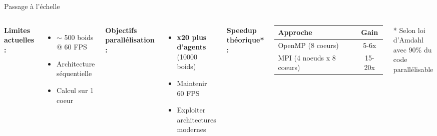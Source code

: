 \documentclass[aspectratio=169]{beamer}
\begin{document}
\begin{frame}{Passage à l'échelle}
\begin{columns}
    \textbf{Limites actuelles :}
    \begin{itemize}
        \item $\sim$ 500 boids @ 60 FPS 
        \item Architecture séquentielle
        \item Calcul sur 1 coeur
    \end{itemize}

    \vspace{0.5cm}

    \textbf{Objectifs parallélisation :}
    \begin{itemize}
        \item \textbf{x20 plus d'agents} (10000 boids)
        \item Maintenir 60 FPS
        \item Exploiter architectures modernes
    \end{itemize}

    \centering
    \textbf{Speedup théorique* :}

    \vspace{0.3cm}

    \begin{tabular}{lc}
        \hline
        \textbf{Approche} & \textbf{Gain} \\
        \hline
        OpenMP (8 coeurs) & 5-6x \\
        MPI (4 noeuds x 8 coeurs) & 15-20x \\
    \end{tabular}

    \vspace{0.5cm}

    \footnotesize
    * Selon loi d'Amdahl avec 90\% du code parallélisable
\end{columns}
\end{frame}
\end{document}
